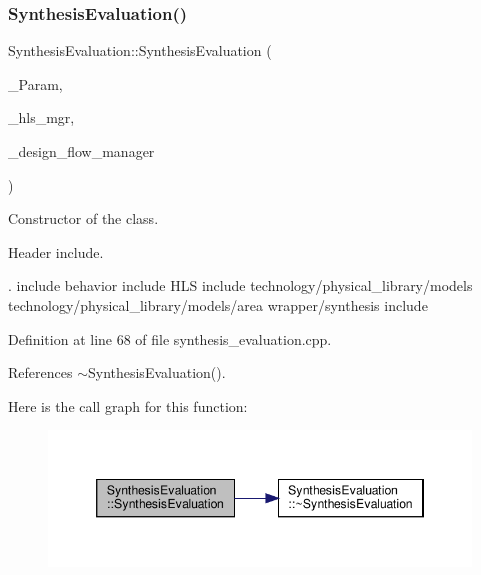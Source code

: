 \subsubsection{\texorpdfstring{Synthesis\+Evaluation()}{SynthesisEvaluation()}}
{\footnotesize\ttfamily Synthesis\+Evaluation\+::\+Synthesis\+Evaluation (\begin{DoxyParamCaption}\item[{const \hyperlink{Parameter_8hpp_a37841774a6fcb479b597fdf8955eb4ea}{Parameter\+Const\+Ref}}]{\+\_\+\+Param,  }\item[{const \hyperlink{hls__manager_8hpp_acd3842b8589fe52c08fc0b2fcc813bfe}{H\+L\+S\+\_\+manager\+Ref}}]{\+\_\+hls\+\_\+mgr,  }\item[{const Design\+Flow\+Manager\+Const\+Ref}]{\+\_\+design\+\_\+flow\+\_\+manager }\end{DoxyParamCaption})}



Constructor of the class. 

Header include.

. include behavior include H\+LS include technology/physical\+\_\+library/models technology/physical\+\_\+library/models/area wrapper/synthesis include 

Definition at line 68 of file synthesis\+\_\+evaluation.\+cpp.



References $\sim$\+Synthesis\+Evaluation().

Here is the call graph for this function\+:
\nopagebreak
\begin{figure}[H]
\begin{center}
\leavevmode
\includegraphics[width=346pt]{d6/d46/classSynthesisEvaluation_aab6715194330034735598d4c877d84ca_cgraph}
\end{center}
\end{figure}
\mbox{\label{classSynthesisEvaluation_a27beacf8d148b14fa4508a6e701a34fd}} 
